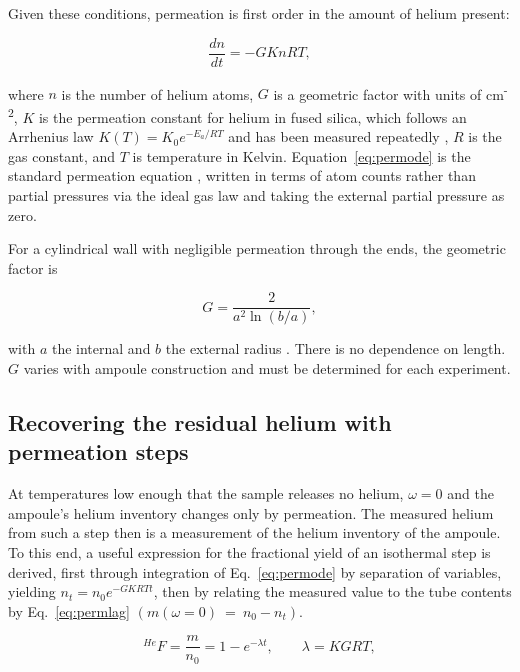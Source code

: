 Given these conditions, permeation is first order in the amount of helium present:

\begin{equation}
\label{eq:permode}
\frac{dn}{dt} = -GKnRT ,
\end{equation}
 
where $n$ is the number of helium atoms, $G$ is a geometric factor with units of cm\textsuperscript{-2}, $K$ is the permeation constant for helium in fused silica, which follows an Arrhenius law $K(T) = K_{0}e^{-E_{a}/RT}$ and has been measured repeatedly \citep{norton1953,altemose1961,swets1961,masaryk1968}, $R$ is the gas constant, and $T$ is temperature in Kelvin. Equation~\eqref{eq:permode} is the standard permeation equation \citep{norton1953,altemose1961,swets1961,masaryk1968}, written in terms of atom counts rather than partial pressures via the ideal gas law and taking the external partial pressure as zero. 

For a cylindrical wall with negligible permeation through the ends, the geometric factor is 

\begin{equation}
\label{eq:geomfactor}
G = \frac{2}{a^{2}\ln(b/a)} ,
\end{equation}

with $a$ the internal and $b$ the external radius \citep{masaryk1968}. There is no dependence on length. $G$ varies with ampoule construction and must be determined for each experiment.

\subsection{Recovering the residual helium with permeation steps}\label{sec:permeation-steps}

At temperatures low enough that the sample releases no helium, $\omega = 0$ and the ampoule's helium inventory changes only by permeation. The measured helium from such a step then is a measurement of the helium inventory of the ampoule. To this end, a useful expression for the fractional yield of an isothermal step is derived, first through integration of Eq.~\eqref{eq:permode} by separation of variables, yielding $n_t = n_0e^{-GKRTt}$, then by relating the measured value to the tube contents by Eq.~\eqref{eq:permlag} $\left(m(\omega=0)~=~n_0-n_t\right)$.

\begin{equation}
\label{eq:permsol}
^{He}F = \frac{m}{n_{0}} = 1 - e^{-\lambda t} , \qquad \lambda = KGRT ,
\end{equation}

